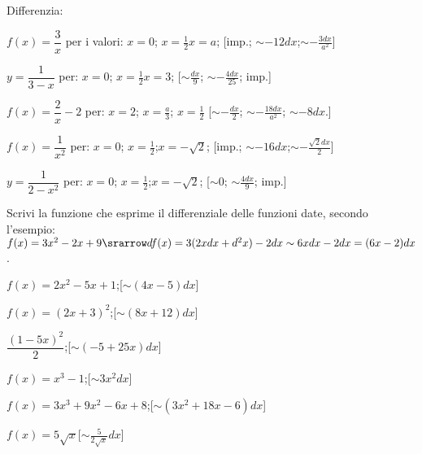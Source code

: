 \begin{esercizio} \label{ese:dif06}
Differenzia:
\begin{enumeratea}
  \item  \(f(x)=\dfrac{3}{x}\) per i valori:\hspace{1.5em} \(x=0\);
  \hspace{1.5em}  \(x=\frac{1}{2}\)\hspace{1.5em}\(x=a\); 
  \hfill [imp.; \(\sim-12dx\);\(\sim -\frac{3dx}{a^2}\)]
 \item \(y=\dfrac{1}{3-x}\) per:\hspace{1.5em} \(x=0\);\hspace{1.5em}
  \(x=\frac{1}{2}\)\hspace{1.5em}\(x=3\);
   \hfill [\(\sim \frac{dx}{9}\); \(\sim -\frac{4dx}{25}\); imp.]
  \item \(f(x)=\dfrac{2}{x}-2\) per:\hspace{1.5em} \(x=2\);\hspace{1.5em}
  \(x=\frac{a}{3}\);  \(x=\frac{1}{2}\) 
  \hfill [\(\sim -\frac{dx}{2}\); \(\sim -\frac{18dx}{a^2}\); \(\sim -8dx\).]
  \item \(f(x)=\dfrac{1}{x^2}\) per:\hspace{1.5em} \(x=0\);\hspace{1.5em}
  \(x=\frac{1}{2}\);\hspace{1.5em}\(x=-\sqrt{2}\);
  \hfill [imp.; \(\sim-16dx\);\(\sim -\frac{\sqrt{2}dx}{2}\)]
  \item \(y=\dfrac{1}{2-x^2}\) per:\hspace{1.5em} \(x=0\);\hspace{1.5em}
  \(x=\frac{1}{2}\);\hspace{1.5em}\(x=-\sqrt{2}\);
   \hfill [\(\sim 0\); \(\sim \frac{4dx}{9}\); imp.]
 \end{enumeratea} 
\end{esercizio}

\begin{esercizio}\label{ese:dif06}
Scrivi la funzione che esprime il differenziale delle funzioni date, secondo 
l'esempio:\\
\(f(x)=3x^2-2x+9\srarrow df(x)= 3(2xdx+d^2x)-2dx\sim 6xdx-2dx = (6x-2)dx\).
 \begin{enumeratea}
  \item \(f(x)=2x^2-5x+1\);\hfill [\(\sim (4x-5)dx\)]
  \item \(f(x)=(2x+3)^2\);\hfill [\(\sim (8x+12)dx\)]
  \item \(\dfrac{(1-5x)^2}{2}\);\hfill [\(\sim (-5+25x)dx\)]
  \item \(f(x)=x^3-1\);\hfill [\(\sim 3x^2dx\)]
  \item \(f(x)=3x^3+9x^2-6x+8\);\hfill [\(\sim (3x^2+18x-6)dx\)]
  \item \(f(x)=5\sqrt{x}\)\hfill [\(\sim \frac{5}{2\sqrt{x}}dx\)]
 \end{enumeratea}
\end{esercizio}

